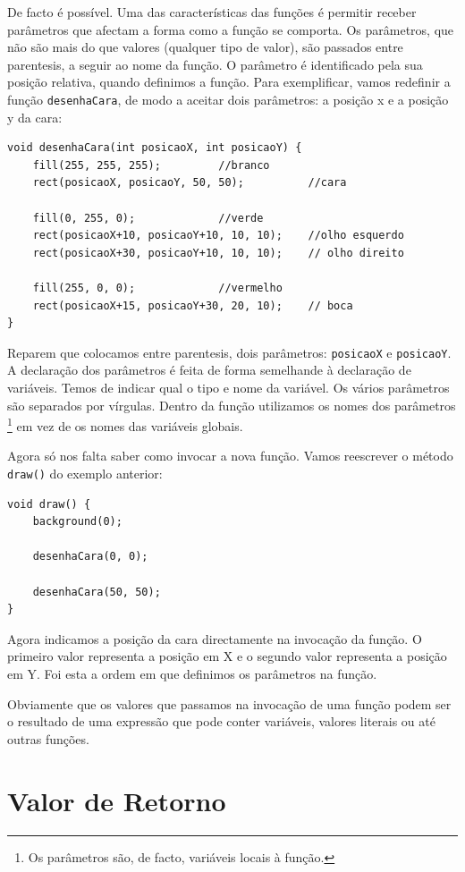 De facto é possível. Uma das características das funções é permitir receber parâmetros que afectam a forma como a função se comporta. Os parâmetros, que não são mais do que valores (qualquer tipo de valor), são passados entre parentesis, a seguir ao nome da função. O parâmetro é identificado pela sua posição relativa, quando definimos a função. Para exemplificar, vamos redefinir a função \texttt{desenhaCara}, de modo a aceitar dois parâmetros: a posição x e a posição y da cara:
\begin{lstlisting}
void desenhaCara(int posicaoX, int posicaoY) {
    fill(255, 255, 255);         //branco
    rect(posicaoX, posicaoY, 50, 50);          //cara
    
    fill(0, 255, 0);             //verde
    rect(posicaoX+10, posicaoY+10, 10, 10);    //olho esquerdo
    rect(posicaoX+30, posicaoY+10, 10, 10);    // olho direito
    
    fill(255, 0, 0);             //vermelho
    rect(posicaoX+15, posicaoY+30, 20, 10);    // boca       
}
\end{lstlisting}
Reparem que colocamos entre parentesis, dois parâmetros: \texttt{posicaoX} e \texttt{posicaoY}. A declaração dos parâmetros é feita de forma semelhande à declaração de variáveis. Temos de indicar qual o tipo e nome da variável. Os vários parâmetros são separados por vírgulas. Dentro da função utilizamos os nomes dos parâmetros%
\footnote{Os parâmetros são, de facto, variáveis locais à função.}
 em vez de os nomes das variáveis globais.
 
Agora só nos falta saber como invocar a nova função. Vamos reescrever o método \texttt{draw()} do exemplo anterior:
\begin{lstlisting}
void draw() {
    background(0);
    
    desenhaCara(0, 0);
    
    desenhaCara(50, 50);  
}
\end{lstlisting}

Agora indicamos a posição da cara directamente na invocação da função. O primeiro valor representa a posição em X e o segundo valor representa a posição em Y. Foi esta a ordem em que definimos os parâmetros na função. 

Obviamente que os valores que passamos na invocação de uma função podem ser o resultado de uma expressão que pode conter variáveis, valores literais ou até outras funções.



\section{Valor de Retorno}

